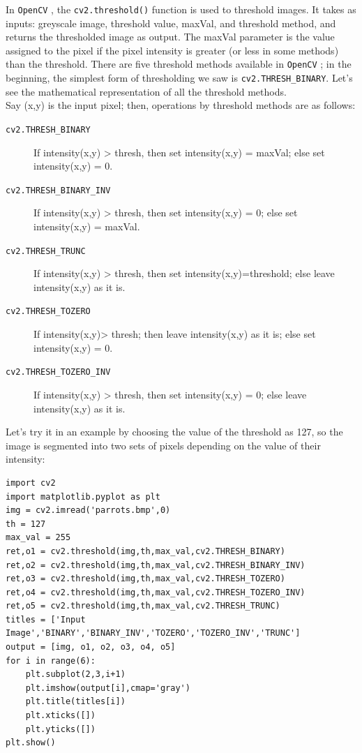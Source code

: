\documentclass{labo}
\newcommand{\opencv}{\texttt{OpenCV} }
\begin{document}
In \opencv, the \texttt{cv2.threshold()} function is used to threshold images. It takes as inputs: greyscale image, threshold value, maxVal, and threshold method, and returns the thresholded image as output. The maxVal parameter is the value assigned to the pixel if the pixel intensity is greater (or less in some methods) than the threshold. There are five threshold methods available in \opencv; in the beginning, the simplest form of thresholding we saw is \texttt{cv2.THRESH\_BINARY}. Let's see the mathematical representation of all the threshold methods.\\

Say (x,y) is the input pixel; then, operations by threshold methods are as follows:
\begin{description}
	\item[\texttt{cv2.THRESH\_BINARY}] If intensity(x,y) > thresh, then set intensity(x,y) = maxVal; else set intensity(x,y) = 0. 
	\item[\texttt{cv2.THRESH\_BINARY\_INV}] If intensity(x,y) > thresh, then set intensity(x,y) = 0; else set intensity(x,y) = maxVal.
	\item[\texttt{cv2.THRESH\_TRUNC}]  If intensity(x,y) > thresh, then set intensity(x,y)=threshold; else leave intensity(x,y) as it is.
	\item[\texttt{cv2.THRESH\_TOZERO}] If intensity(x,y)> thresh; then leave intensity(x,y) as it is; else set intensity(x,y) = 0.
	\item[\texttt{cv2.THRESH\_TOZERO\_INV}] If intensity(x,y) > thresh, then set intensity(x,y) = 0; else leave intensity(x,y) as it is.
\end{description}

Let’s try it in an example by choosing the value of the threshold as 127, so the image is segmented into two sets of pixels depending on the value of their intensity:

\begin{verbatim}
import cv2 
import matplotlib.pyplot as plt 
img = cv2.imread('parrots.bmp',0) 
th = 127 
max_val = 255 
ret,o1 = cv2.threshold(img,th,max_val,cv2.THRESH_BINARY) 
ret,o2 = cv2.threshold(img,th,max_val,cv2.THRESH_BINARY_INV) 
ret,o3 = cv2.threshold(img,th,max_val,cv2.THRESH_TOZERO) 
ret,o4 = cv2.threshold(img,th,max_val,cv2.THRESH_TOZERO_INV) 
ret,o5 = cv2.threshold(img,th,max_val,cv2.THRESH_TRUNC) 
titles = ['Input Image','BINARY','BINARY_INV','TOZERO','TOZERO_INV','TRUNC']
output = [img, o1, o2, o3, o4, o5] 
for i in range(6): 
	plt.subplot(2,3,i+1)
	plt.imshow(output[i],cmap='gray') 
	plt.title(titles[i]) 
	plt.xticks([])
	plt.yticks([]) 
plt.show()
\end{verbatim}
\end{document}
